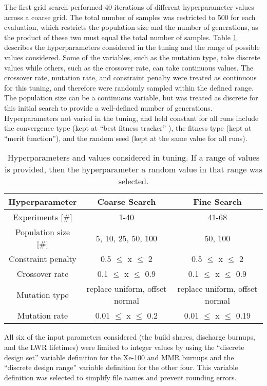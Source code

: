 The 
first grid search performed 40 iterations of different hyperparameter 
values across a coarse grid. The total number of samples was restricted to 
500 for each evaluation, which restricts the population size and the 
number of generations, as the product of these two must equal the 
total number of samples. Table \ref{tab:soga_tuning} describes 
the hyperparameters considered in the tuning and the range of possible 
values considered. Some of the variables, such as the mutation 
type, take discrete values while others, such as the crossover 
rate, can take continuous values. The crossover rate, mutation 
rate, and constraint penalty were treated as continuous for this 
tuning, and therefore were randomly sampled within the defined range. 
The population size can be a continuous variable, but was 
treated as discrete for this initial search to provide a well-defined 
number of generations. Hyperparameters not varied in the tuning, and 
held constant for all runs include the convergence type (kept at
``best fitness tracker'' ), the fitness type (kept at ``merit function''),
and the random seed (kept at the same value for all runs).

\begin{table}
    \centering 
    \caption{Hyperparameters and values considered in tuning. If a range 
    of values is provided, then the hyperparameter a random value in 
    that range was selected.}
    \label{tab:soga_tuning}
    \begin{tabular}{c c c}
        \hline
        Hyperparameter & Coarse Search & Fine Search \\
        \hline 
        Experiments [\#] & 1-40 & 41-68 \\
        Population size [\#] & 5, 10, 25, 50, 100 & 50, 100\\
        Constraint penalty & 0.5 $\leq$ x $\leq$ 2 & 0.5 $\leq$ x $\leq$ 2\\
        Crossover rate & 0.1 $\leq$ x $\leq$ 0.9 & 0.1 $\leq$ x $\leq$ 0.9\\
        Mutation type & replace uniform, offset normal & replace uniform, offset normal\\
        Mutation rate & 0.01 $\leq$ x $\leq$ 0.2 & 0.01 $\leq$ x $\leq$ 0.19\\
        \hline       
    \end{tabular}
\end{table}

All six of the input parameters considered (the build shares, discharge burnups, 
and the \gls{LWR} lifetimes) were limited to integer
values by using the ``discrete design set'' variable definition for the 
Xe-100 and \gls{MMR} burnups and the ``discrete design range'' variable 
definition for the other four. This variable definition was selected to 
simplify file names and prevent rounding errors.


